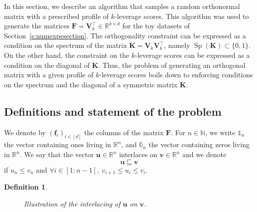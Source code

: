 \documentclass[twoside,11pt]{book}
\newtheorem{definition}{Definition}
\numberwithin{theorem}{chapter}
\numberwithin{definition}{chapter}
\numberwithin{proposition}{chapter}
\numberwithin{corollary}{chapter}
\numberwithin{example}{chapter}
\numberwithin{lemma}{chapter}
\numberwithin{assumption}{chapter}
\numberwithin{equation}{chapter}
\numberwithin{figure}{chapter}
\DeclareMathOperator{\Sp}{\mathrm{Sp}}
\DeclareMathOperator{\Tran}{\intercal}
\begin{document}
\begin{subappendices}
In this section, we describe an algorithm that samples a random orthonormal matrix with a prescribed profile of $k$-leverage scores. This algorithm was used to generate the matrices $\bm{F} = \bm{V}_{k}^{\Tran} \in \mathbb{R}^{k \times d}$ for the toy datasets of Section~\ref{s:numexpesection}. The orthogonality constraint can be expressed as a condition on the spectrum of the matrix $\bm{K} = \bm{V}_{k}^{}\bm{V}_{k}^{\Tran}$, namely $\Sp(\bm{K}) \subset \{0,1\}$. On the other hand, the constraint on the $k$-leverage scores can be expressed as a condition on the diagonal of $\bm{K}$. Thus, the problem of generating an orthogonal matrix with a given profile of $k$-leverage scores boils down to enforcing conditions on the spectrum and the diagonal of a symmetric matrix $\bm{K}$.

\subsection{Definitions and statement of the problem}
 We denote by $(\bm{f}_{i})_{i \in [d]}$ the columns of the matrix $\bm{F}$. For $n \in \mathbb{N}$, we write $\mathbb{1}_{n}$ the vector containing ones living in $\mathbb{R}^{n}$, and $\mathbb{0}_{n}$ the vector containing zeros living in $\mathbb{R}^{n}$. We say that the vector $\bm{u} \in \mathbb{R}^{n}$ interlaces on $\bm{v} \in \mathbb{R}^{n}$ and we denote $$\bm{u} \sqsubseteq \bm{v}$$
if $u_{n} \leq v_{n}$ and $\forall i \in [1:n-1], \: v_{i+1} \leq u_{i} \leq v_{i}$.
\begin{definition}

\begin{figure}[!ht]
    \centering
    
    \caption{Illustration of the interlacing of $\bm{u}$ on $\bm{v}$.}
    \label{f:Interlacing_eigenvalues}
\end{figure}


\end{definition}
\end{subappendices}
\end{document}
